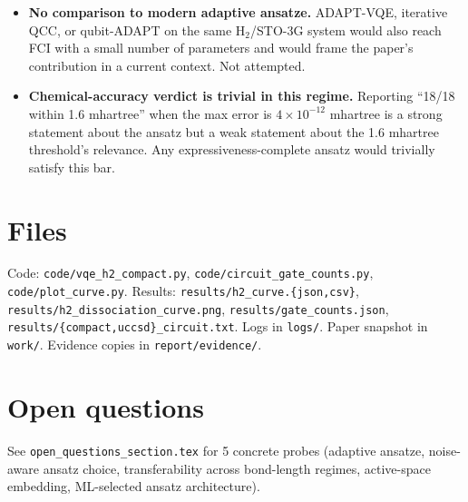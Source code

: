 \documentclass[11pt]{article}
\begin{document}
\begin{itemize}
\item \textbf{No comparison to modern adaptive ansatze.} ADAPT-VQE, iterative
QCC, or qubit-ADAPT on the same H$_2$/STO-3G system would also reach FCI with
a small number of parameters and would frame the paper's contribution in a
current context. Not attempted.

\item \textbf{Chemical-accuracy verdict is trivial in this regime.}
Reporting ``18/18 within 1.6 mhartree'' when the max error is $4\times 10^{-12}$
mhartree is a strong statement about the ansatz but a weak statement about
the 1.6 mhartree threshold's relevance. Any expressiveness-complete ansatz
would trivially satisfy this bar.
\end{itemize}

\section{Files}
Code: \texttt{code/vqe\_h2\_compact.py}, \texttt{code/circuit\_gate\_counts.py},
\texttt{code/plot\_curve.py}. Results:
\texttt{results/h2\_curve.\{json,csv\}}, \texttt{results/h2\_dissociation\_curve.png},
\texttt{results/gate\_counts.json},
\texttt{results/\{compact,uccsd\}\_circuit.txt}. Logs in \texttt{logs/}.
Paper snapshot in \texttt{work/}. Evidence copies in \texttt{report/evidence/}.

\section{Open questions}
See \texttt{open\_questions\_section.tex} for 5 concrete probes (adaptive
ansatze, noise-aware ansatz choice, transferability across bond-length regimes,
active-space embedding, ML-selected ansatz architecture).
\end{document}

